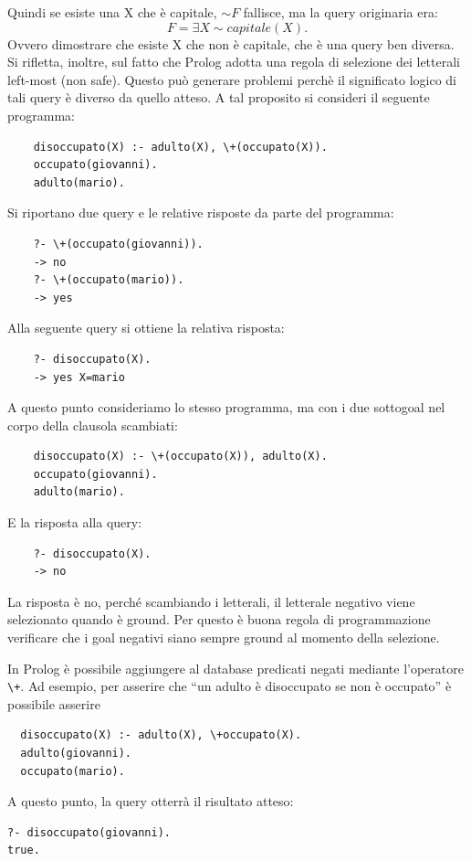 \documentclass[answers, a4paper, 11pt]{exam}
\begin{document}
\begin{questions}
\begin{solution}
\begin{equation*}
  \end{equation*}
  Quindi se esiste una X che è capitale, $\sim F$ fallisce, ma la query originaria era:
  \begin{equation*}
    F= \exists X \sim capitale(X).
  \end{equation*}
  Ovvero dimostrare che esiste X che non è capitale, che è una query ben diversa.
  Si rifletta, inoltre, sul fatto che Prolog adotta una regola di selezione dei letterali left-most (non safe). Questo può generare problemi perchè il significato logico di tali query è diverso da quello atteso.
  A tal proposito si consideri il seguente programma:
  \begin{verbatim}
    disoccupato(X) :- adulto(X), \+(occupato(X)).
    occupato(giovanni).
    adulto(mario).
  \end{verbatim}
  Si riportano due query e le relative risposte da parte del programma:
  \begin{verbatim}
    ?- \+(occupato(giovanni)).
    -> no
    ?- \+(occupato(mario)).
    -> yes
  \end{verbatim}
  Alla seguente query si ottiene la relativa risposta:
  \begin{verbatim}
    ?- disoccupato(X).
    -> yes X=mario
  \end{verbatim}
  A questo punto consideriamo lo stesso programma, ma con i due sottogoal nel corpo della clausola scambiati:
  \begin{verbatim}
    disoccupato(X) :- \+(occupato(X)), adulto(X).
    occupato(giovanni).
    adulto(mario).
  \end{verbatim}
  E la risposta alla query:
  \begin{verbatim}
    ?- disoccupato(X).
    -> no
  \end{verbatim}
  La risposta è no, perché scambiando i letterali, il letterale negativo viene selezionato quando è ground.
  Per questo è buona regola di programmazione verificare che i goal negativi siano sempre ground al momento della selezione.


  In Prolog è possibile aggiungere al database predicati negati mediante l'operatore \texttt{\textbackslash +}. 
  Ad esempio, per asserire che ``un adulto è disoccupato se non è occupato'' è possibile asserire 
  \begin{verbatim}
  disoccupato(X) :- adulto(X), \+occupato(X).
  adulto(giovanni).
  occupato(mario).
  \end{verbatim}
  A questo punto, la query otterrà il risultato atteso:
  \begin{verbatim}
?- disoccupato(giovanni).
true.


\end{verbatim}
\end{solution}
\end{questions}
\end{document}

